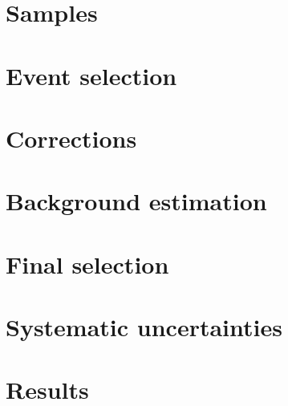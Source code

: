 \section{Samples} \label{sec:Samples}


\section{Event selection} \label{sec:EventSelection}


\section{Corrections} \label{sec:Corrections}


\section{Background estimation} \label{sec:Backgrounds}


\section{Final selection} \label{sec:FinalSelection}


\section{Systematic uncertainties} \label{sec:Systematics}


\section{Results} \label{sec:Results}

